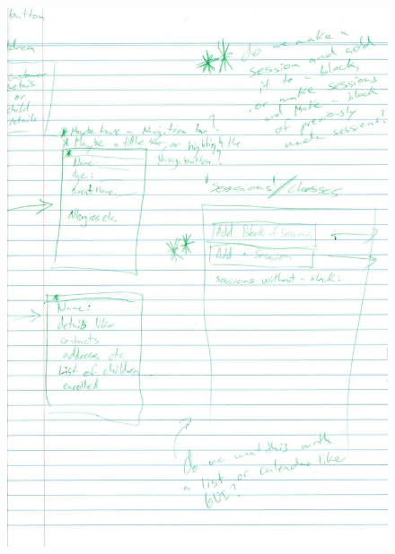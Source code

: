 \documentclass{l3proj}
\begin{document}
{
\begin{figure}[h]
\centering
\includegraphics[scale=0.50]{0085_001-page-008.jpg}
\end{figure}
}

\pagebreak
\end{document}

